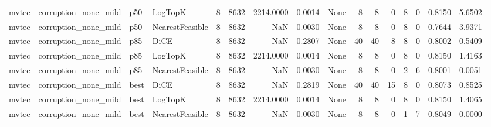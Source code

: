 \begin{tabular}{llllrrrrlrrrrrrr}
  mvtec & corruption\_none\_mild &    p50 &         LogTopK &            8 &                 8632 &                2214.0000 &      0.0014 &                                               None &      8 &            8 &        0 &              8 &          0 &             0.8150 &         5.6502 \\
  mvtec & corruption\_none\_mild &    p50 & NearestFeasible &            8 &                 8632 &                      NaN &      0.0030 &                                               None &      8 &            8 &        0 &              8 &          0 &             0.7644 &         3.9371 \\
  mvtec & corruption\_none\_mild &    p85 &            DiCE &            8 &                 8632 &                      NaN &      0.2807 &                                               None &     40 &           40 &        8 &              8 &          0 &             0.8002 &         0.5409 \\
  mvtec & corruption\_none\_mild &    p85 &         LogTopK &            8 &                 8632 &                2214.0000 &      0.0014 &                                               None &      8 &            8 &        0 &              8 &          0 &             0.8150 &         1.4163 \\
  mvtec & corruption\_none\_mild &    p85 & NearestFeasible &            8 &                 8632 &                      NaN &      0.0030 &                                               None &      8 &            8 &        0 &              2 &          6 &             0.8001 &         0.0051 \\
  mvtec & corruption\_none\_mild &   best &            DiCE &            8 &                 8632 &                      NaN &      0.2819 &                                               None &     40 &           40 &       15 &              8 &          0 &             0.8073 &         0.8525 \\
  mvtec & corruption\_none\_mild &   best &         LogTopK &            8 &                 8632 &                2214.0000 &      0.0014 &                                               None &      8 &            8 &        0 &              8 &          0 &             0.8150 &         1.4065 \\
  mvtec & corruption\_none\_mild &   best & NearestFeasible &            8 &                 8632 &                      NaN &      0.0030 &                                               None &      8 &            8 &        0 &              1 &          7 &             0.8049 &         0.0000 \\

\end{tabular}
